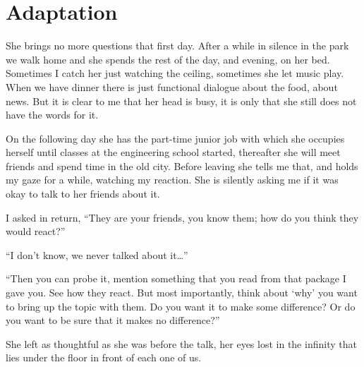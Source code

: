 \chapter*{Adaptation}\label{adaptation}

She brings no more questions that first day. After a while in silence in the park we walk home and she spends the rest of the day, and evening, on her bed. Sometimes I catch her just watching the ceiling, sometimes she let music play. When we have dinner there is just functional dialogue about the food, about news. But it is clear to me that her head is busy, it is only that she still does not have the words for it.

On the following day she has the part-time junior job with which she occupies herself until classes at the engineering school started, thereafter she will meet friends and spend time in the old city. Before leaving she tells me that, and holds my gaze for a while, watching my reaction. She is silently asking me if it was okay to talk to her friends about it.

I asked in return, \enquote{They are your friends, you know them; how do you think they would react?}

\enquote{I don't know, we never talked about it\dots{}}

\enquote{Then you can probe it, mention something that you read from that package I gave you. See how they react. But most importantly, think about \enquote{why} you want to bring up the topic with them. Do you want it to make some difference? Or do you want to be sure that it makes no difference?}

She left as thoughtful as she was before the talk, her eyes lost in the infinity that lies under the floor in front of each one of us.